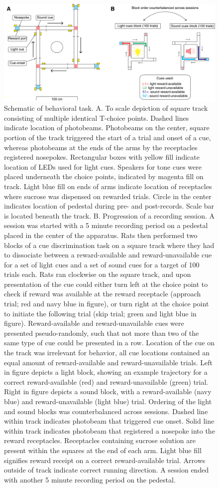 \documentclass[11pt]{article}
\begin{document}
\begin{figure}[h]
\centering
\includegraphics[width=\textwidth]{Fig 2 - Schematic task.png}
\caption{Schematic of behavioral task. A. To scale depiction of square track consisting of multiple identical T-choice points. Dashed lines indicate location of photobeams. Photobeams on the center, square portion of the track triggered the start of a trial and onset of a cue, whereas photobeams at the ends of the arms by the receptacles registered nosepokes. Rectangular boxes with yellow fill indicate location of LEDs used for light cues. Speakers for tone cues were placed underneath the choice points, indicated by magenta fill on track. Light blue fill on ends of arms indicate location of receptacles where sucrose was dispensed on rewarded trials. Circle in the center indicates location of pedestal during pre- and post-records. Scale bar is located beneath the track. B. Progression of a recording session. A session was started with a 5 minute recording period on a pedestal placed in the center of the apparatus. Rats then performed two blocks of a cue discrimination task on a square track where they had to dissociate between a reward-available and reward-unavailable cue for a set of light cues and a set of sound cues for a target of 100 trials each. Rats ran clockwise on the square track, and upon presentation of the cue could either turn left at the choice point to check if reward was available at the reward receptacle (approach trial; red and navy blue in figure), or turn right at the choice point to initiate the following trial (skip trial; green and light blue in figure). Reward-available and reward-unavailable cues were presented pseudo-randomly, such that not more than two of the same type of cue could be presented in a row. Location of the cue on the track was irrelevant for behavior, all cue locations contained an equal amount of reward-available and reward-unavailable trials. Left in figure depicts a light block, showing an example trajectory for a correct reward-available (red) and reward-unavailable (green) trial. Right in figure depicts a sound block, with a reward-available (navy blue) and reward-unavailable (light blue) trial. Ordering of the light and sound blocks was counterbalanced across sessions. Dashed line within track indicates photobeam that triggered cue onset. Solid line within track indicates photobeam that registered a nosepoke into the reward receptacles. Receptacles containing sucrose solution are present within the squares at the end of each arm. Light blue fill signifies reward receipt on a correct reward-available trial. Arrows outside of track indicate correct running direction. A session ended with another 5 minute recording period on the pedestal.}

\end{figure}
\end{document}
